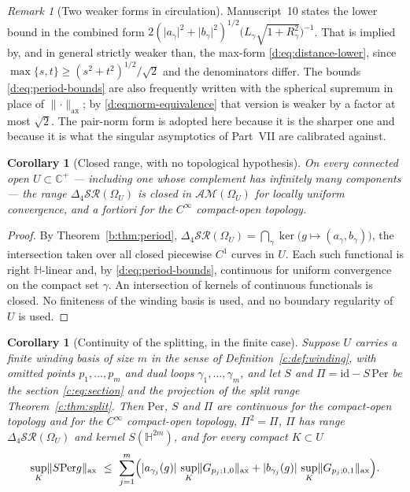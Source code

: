 \documentclass[11pt,a4paper]{article}
\numberwithin{equation}{section}
\newtheorem{corollary}[theorem]{Corollary}
\theoremstyle{definition}
\theoremstyle{remark}
\newtheorem{remark}[theorem]{Remark}
\theoremstyle{plain}
\newcommand{\HH}{\mathbb H}
\newcommand{\CC}{\mathbb C}
\newcommand{\Cplus}{\CC^{+}}
\newcommand{\lap}{\Delta_4}
\newcommand{\SR}{\mathcal{SR}}
\newcommand{\AM}{\mathcal{AM}}
\newcommand{\Om}{\Omega}
\newcommand{\Per}{\mathrm{Per}}
\newcommand{\axn}[1]{\lVert #1\rVert_{\mathrm{ax}}}   %
\newcommand{\abs}[1]{\lvert #1\rvert}
\begin{document}
\begin{remark}[Two weaker forms in circulation]
\label{d:rem:weaker-distance}
Manuscript~10 states the lower bound in the combined form
$2(\abs{a_\gamma}^2+\abs{b_\gamma}^2)^{1/2}
 \bigl(L_\gamma\sqrt{1+R_\gamma^2}\bigr)^{-1}$.
That is implied by, and in general strictly weaker than, the max-form
\eqref{d:eq:distance-lower}, since
$\max\{s,t\}\ge(s^2+t^2)^{1/2}/\sqrt2$ and the denominators differ.  The
bounds \eqref{d:eq:period-bounds} are also frequently written with the
spherical supremum in place of $\axn\cdot$; by
\eqref{d:eq:norm-equivalence} that version is weaker by a factor at most
$\sqrt2$.  The pair-norm form is adopted here because it is the sharper
one and because it is what the singular asymptotics of Part~VII are
calibrated against.
\end{remark}

\begin{corollary}[Closed range, with no topological hypothesis]
\label{d:cor:closed-range}
On every connected open $U\subset\Cplus$ --- including one whose
complement has infinitely many components --- the range $\lap\SR(\Om_U)$ is
closed in $\AM(\Om_U)$ for locally uniform convergence, and a fortiori for
the $C^\infty$ compact-open topology.
\end{corollary}

\begin{proof}
By Theorem~\ref{b:thm:period},
$\lap\SR(\Om_U)=\bigcap_\gamma\ker\bigl(g\mapsto(a_\gamma,b_\gamma)\bigr)$,
the intersection taken over all closed piecewise $C^1$ curves in $U$.  Each
such functional is right $\HH$-linear and, by
\eqref{d:eq:period-bounds}, continuous for uniform convergence on the
compact set $\gamma$.  An intersection of kernels of continuous functionals
is closed.  No finiteness of the winding basis is used, and no boundary
regularity of $U$ is used.
\end{proof}

\begin{corollary}[Continuity of the splitting, in the finite case]
\label{d:cor:projection}
Suppose $U$ carries a finite winding basis of size $m$ in the sense of
Definition~\ref{c:def:winding}, with omitted points $p_1,\dots,p_m$ and
dual loops $\gamma_1,\dots,\gamma_m$, and let $S$ and
$\Pi=\mathrm{id}-S\,\Per$ be the section \eqref{c:eq:section} and the
projection of the split range Theorem~\ref{c:thm:split}.  Then $\Per$,
$S$ and $\Pi$ are continuous for the compact-open topology and for the
$C^\infty$ compact-open topology, $\Pi^2=\Pi$, $\Pi$ has range
$\lap\SR(\Om_U)$ and kernel $S(\HH^{2m})$, and for every compact
$K\subset U$
\begin{equation}
 \sup_K\axn{S\Per g}\ \le\
 \sum_{j=1}^m\Bigl(
   \abs{a_{\gamma_j}(g)}\,\sup_K\axn{G_{p_j;1,0}}
  +\abs{b_{\gamma_j}(g)}\,\sup_K\axn{G_{p_j;0,1}}\Bigr).
 \label{d:eq:correction-bound}
\end{equation}
\end{corollary}
\end{document}
